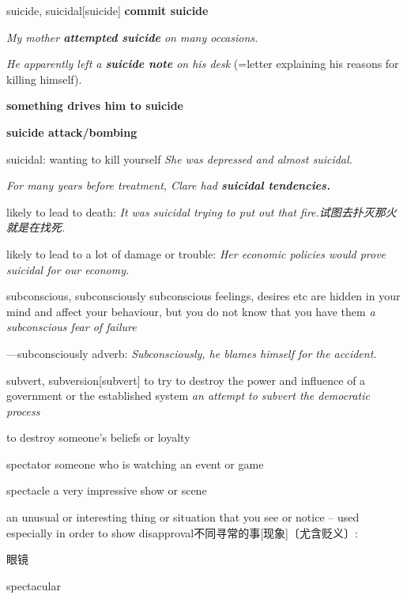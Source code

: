 \begin{DefWord}{suicide, suicidal}[suicide]
    \textbf{commit suicide}

    \textit{My mother \textbf{attempted suicide} on many occasions.}

    \textit{He apparently left a \textbf{suicide note} on his desk} (=letter explaining his reasons for killing himself).

    \textbf{something drives him to suicide}

    \textbf{suicide attack/bombing}

    suicidal: 
    wanting to kill yourself
    \textit{She was depressed and almost suicidal.}

    \textit{For many years before treatment, Clare had \textbf{suicidal tendencies.}}

    likely to lead to death:
    \textit{It was suicidal trying to put out that fire.试图去扑灭那火就是在找死. }

    likely to lead to a lot of damage or trouble: 
    \textit{Her economic policies would prove suicidal for our economy.}
\end{DefWord}

\begin{DefWord}{subconscious, subconsciously}
    subconscious feelings, desires etc are hidden in your mind and affect your behaviour, but you do not know that you have them
    \textit{a subconscious fear of failure}

    —subconsciously adverb:
    \textit{Subconsciously, he blames himself for the accident.}
\end{DefWord}

\begin{DefWord}{subvert, subversion}[subvert]
    to try to destroy the power and influence of a government or the established system
    \textit{an attempt to subvert the democratic process}

    to destroy someone's beliefs or loyalty
\end{DefWord}

\begin{DefWord}{spectator}
    someone who is watching an event or game


\end{DefWord}

\begin{DefWord}{spectacle}
    a very impressive show or scene

    an unusual or interesting thing or situation that you see or notice – used especially in order to show disapproval不同寻常的事[现象]〔尤含贬义〕:

    眼镜
\end{DefWord}

\begin{DefWord}{spectacular}
\end{DefWord}